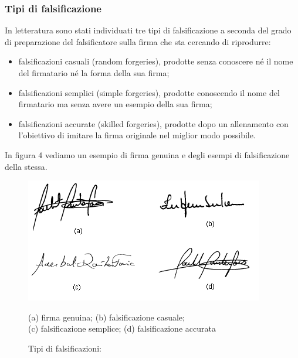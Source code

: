 \subsubsection{Tipi di falsificazione}
\label{2.1.2}
In letteratura sono stati individuati tre tipi di falsificazione a seconda del grado di preparazione del falsificatore sulla firma che sta cercando di riprodurre:
\begin{itemize}
\item falsificazioni casuali (random forgeries), prodotte senza conoscere né il nome del firmatario né la forma della sua firma;
\item falsificazioni semplici (simple forgeries), prodotte conoscendo il nome del firmatario ma senza avere un esempio della sua firma;
\item falsificazioni accurate (skilled forgeries), prodotte dopo un allenamento con l'obiettivo di imitare la firma originale nel miglior modo possibile.
\end{itemize}
In figura 4 vediamo un esempio di firma genuina e degli esempi di falsificazione della stessa.
\begin{figure}[h!]
\centering
\includegraphics[scale=1.0]{../Logo&Header/esempiForged.png}
\caption{Tipi di falsificazioni:} (a) firma genuina; (b) falsificazione casuale;\\
(c) falsificazione semplice; (d) falsificazione accurata
\end{figure}

